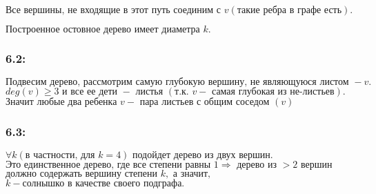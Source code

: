 \documentclass[12pt,a4paper]{scrartcl}
\def\A{\forall}
\begin{document}
\(\text{Все }\allowbreak \text{вершины, }\allowbreak \text{не }\allowbreak \text{входящие }\allowbreak \text{в }\allowbreak \text{этот }\allowbreak \text{путь }\allowbreak \text{соединим }\allowbreak \text{с }\allowbreak v (\text{такие }\allowbreak \text{ребра }\allowbreak \text{в }\allowbreak \text{графе }\allowbreak \text{есть}\allowbreak ).\)

\(\text{Построенное }\allowbreak \text{остовное }\allowbreak \text{дерево }\allowbreak \text{имеет }\allowbreak \text{диаметра }\allowbreak k.\)

\subsubsection*{ 6.2:}

\(\text{Подвесим }\allowbreak \text{дерево, }\allowbreak \text{рассмотрим }\allowbreak \text{самую }\allowbreak \text{глубокую }\allowbreak \text{вершину, }\allowbreak \text{не }\allowbreak \text{являющуюся }\allowbreak \text{листом }\allowbreak - v.\)
\(deg(v) \ge  3\text{ и }\allowbreak \text{все }\allowbreak \text{ее }\allowbreak \text{дети }\allowbreak -\text{ листья }\allowbreak (\text{т.}\allowbreak \text{к. }\allowbreak v -\text{ самая }\allowbreak \text{глубокая }\allowbreak \text{из }\allowbreak \text{не-}\allowbreak \text{листьев}\allowbreak ).\)
\(\text{Значит }\allowbreak \text{любые }\allowbreak \text{два }\allowbreak \text{ребенка }\allowbreak v -\text{ пара }\allowbreak \text{листьев }\allowbreak \text{с }\allowbreak \text{общим }\allowbreak \text{соседом }\allowbreak (v)\)

\subsubsection*{ 6.3:}


\(\A k (\text{в }\allowbreak \text{частности, }\allowbreak \text{для }\allowbreak k = 4)\text{ подойдет }\allowbreak \text{дерево }\allowbreak \text{из }\allowbreak \text{двух }\allowbreak \text{вершин.}\allowbreak \)
\(\text{Это }\allowbreak \text{единственное }\allowbreak \text{дерево, }\allowbreak \text{где }\allowbreak \text{все }\allowbreak \text{степени }\allowbreak {\text{равны }\allowbreak 1} \Rightarrow \text{ дерево }\allowbreak \text{из }\allowbreak > 2\text{ вершин}\allowbreak \)
\(\text{должно }\allowbreak \text{содержать }\allowbreak \text{вершину }\allowbreak \text{степени }\allowbreak k,\text{ а }\allowbreak \text{значит,}\allowbreak \)
\({k-\text{солнышко}\allowbreak }\text{ в }\allowbreak \text{качестве }\allowbreak \text{своего }\allowbreak \text{подграфа.}\allowbreak \)
\end{document}
